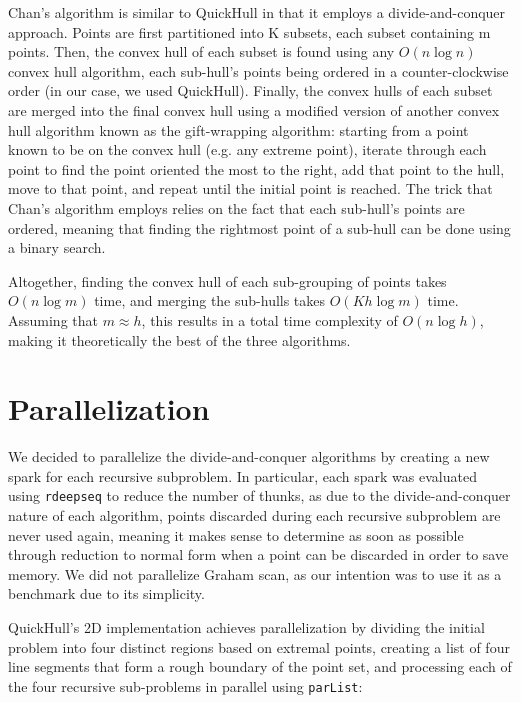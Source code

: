 \documentclass[12pt]{article}
\begin{document}
    \noindent
    Chan’s algorithm is similar to QuickHull in that it employs a divide-and-conquer approach. Points are first partitioned into K subsets, each subset containing m points. Then, the convex hull of each subset is found using any $O(n\log n)$ convex hull algorithm, each sub-hull’s points being ordered in a counter-clockwise order (in our case, we used QuickHull). Finally, the convex hulls of each subset are merged into the final convex hull using a modified version of another convex hull algorithm known as the gift-wrapping algorithm: starting from a point known to be on the convex hull (e.g. any extreme point), iterate through each point to find the point oriented the most to the right, add that point to the hull, move to that point, and repeat until the initial point is reached. The trick that Chan’s algorithm employs relies on the fact that each sub-hull’s points are ordered, meaning that finding the rightmost point of a sub-hull can be done using a binary search.

    Altogether, finding the convex hull of each sub-grouping of points takes $O(n\log m)$ time, and merging the sub-hulls takes $O(Kh\log m)$ time. Assuming that $m \approx h$, this results in a total time complexity of $O(n\log h)$, making it theoretically the best of the three algorithms.

  \section{Parallelization}
  
    We decided to parallelize the divide-and-conquer algorithms by creating a new spark for each recursive subproblem. In particular, each spark was evaluated using \texttt{rdeepseq} to reduce the number of thunks, as due to the divide-and-conquer nature of each algorithm, points discarded during each recursive subproblem are never used again, meaning it makes sense to determine as soon as possible through reduction to normal form when a point can be discarded in order to save memory. We did not parallelize Graham scan, as our intention was to use it as a benchmark due to its simplicity.

    QuickHull's 2D implementation achieves parallelization by dividing the initial problem into four distinct regions based on extremal points, creating a list of four line segments that form a rough boundary of the point set, and processing each of the four recursive sub-problems in parallel using \texttt{parList}:
\end{document}
